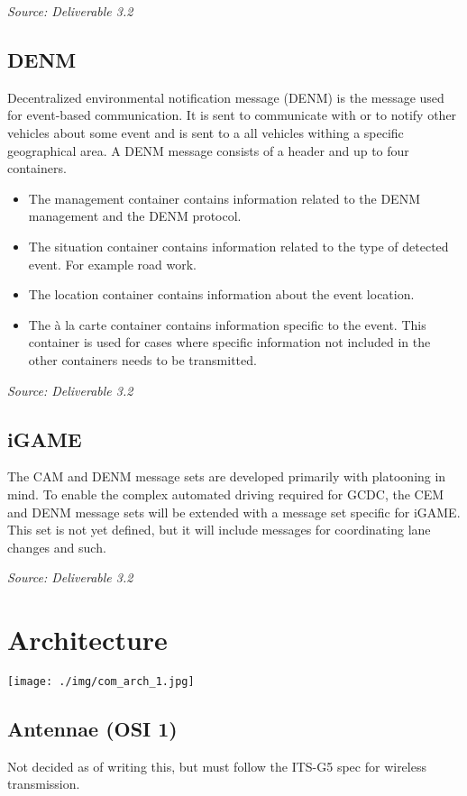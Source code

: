 \documentclass[11pt]{article}
\begin{document}
\emph{Source: Deliverable 3.2}

\subsection{DENM}
\label{sec-2-2}
Decentralized environmental notification message (DENM) is the message
used for event-based communication. It is sent to communicate with or
to notify other vehicles about some event and is sent to a all
vehicles withing a specific geographical area. A DENM message consists
of a header and up to four containers.

\begin{itemize}
\item The management container contains information related to the DENM
management and the DENM protocol.
\item The situation container contains information related to the type of
detected event. For example road work.
\item The location container contains information about the event location.
\item The à la carte container contains information specific to the event.
This container is used for cases where specific information not
included in the other containers needs to be transmitted.
\end{itemize}

\emph{Source: Deliverable 3.2}

\subsection{iGAME}
\label{sec-2-3}
The CAM and DENM message sets are developed primarily with platooning
in mind. To enable the complex automated driving required for GCDC,
the CEM and DENM message sets will be extended with a message set
specific for iGAME. This set is not yet defined, but it will include
messages for coordinating lane changes and such.

\emph{Source: Deliverable 3.2}

\section{Architecture}
\label{sec-3}
\texttt{[image: ./img/com\_arch\_1.jpg]}

\subsection{Antennae (OSI 1)}
\label{sec-3-1}
Not decided as of writing this, but must follow the ITS-G5 spec for
wireless transmission.
\end{document}
